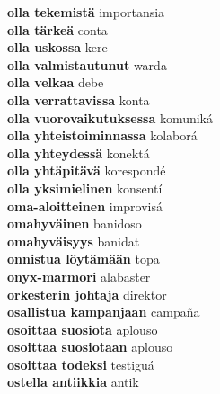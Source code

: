 \textbf{ olla tekemistä  } importansia \\
\textbf{ olla tärkeä  } conta \\
\textbf{ olla uskossa  } kere \\
\textbf{ olla valmistautunut  } warda \\
\textbf{ olla velkaa  } debe \\
\textbf{ olla verrattavissa  } konta \\
\textbf{ olla vuorovaikutuksessa  } komuniká \\
\textbf{ olla yhteistoiminnassa  } kolaborá \\
\textbf{ olla yhteydessä  } konektá \\
\textbf{ olla yhtäpitävä  } korespondé \\
\textbf{ olla yksimielinen  } konsentí \\
\textbf{ oma-aloitteinen  } improvisá \\
\textbf{ omahyväinen  } banidoso \\
\textbf{ omahyväisyys  } banidat \\
\textbf{ onnistua löytämään  } topa \\
\textbf{ onyx-marmori  } alabaster \\
\textbf{ orkesterin johtaja  } direktor \\
\textbf{ osallistua kampanjaan  } campaña \\
\textbf{ osoittaa suosiota  } aplouso \\
\textbf{ osoittaa suosiotaan  } aplouso \\
\textbf{ osoittaa todeksi  } testiguá \\
\textbf{ ostella antiikkia  } antik \\
